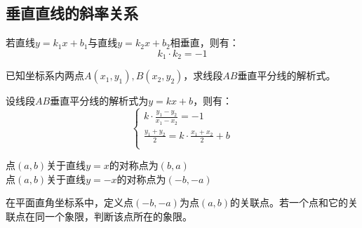 \subsection{垂直直线的斜率关系}
\begin{theorem}
    \begin{minipage}[c]{0.55\textwidth}
        若直线$y=k_1x+b_1$与直线$y=k_2x+b_2$相垂直，则有：$$k_1·k_2=-1$$
    \end{minipage}%
    \begin{minipage}[c]{0.45\textwidth}
        \centering
    \end{minipage}
\end{theorem}

\begin{example}
    已知坐标系内两点$A(x_1,y_1),B(x_2,y_2)$，求线段$AB$垂直平分线的解析式。
\end{example}

\begin{solution}
    设线段$AB$垂直平分线的解析式为$y=kx+b$，则有：
    $$\begin{cases}k·\frac{y_1-y_2}{x_1-x_2}=-1 \\ \frac{y_1+y_2}{2}=k·\frac{x_1+x_2}{2}+b \\ \end{cases}$$
\end{solution}

\begin{corollary}
    点$(a,b)$关于直线$y=x$的对称点为$(b,a)$ \\
    点$(a,b)$关于直线$y=-x$的对称点为$(-b,-a)$
\end{corollary}

\begin{example}
    在平面直角坐标系中，定义点$(-b,-a)$为点$(a,b)$的关联点。若一个点和它的关联点在同一个象限，判断该点所在的象限。
\end{example}

